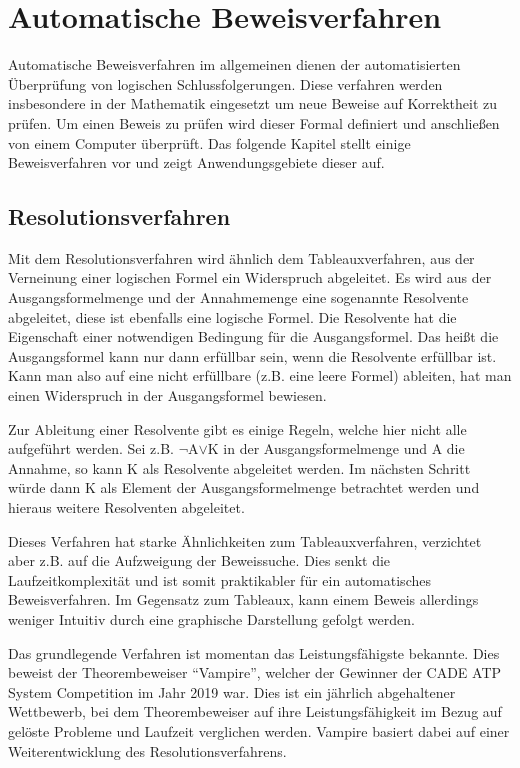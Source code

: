 
\chapter{Automatische Beweisverfahren}
Automatische Beweisverfahren im allgemeinen dienen der automatisierten Überprüfung von logischen Schlussfolgerungen. Diese verfahren werden insbesondere in der Mathematik eingesetzt um neue Beweise auf Korrektheit zu prüfen. Um einen Beweis zu prüfen wird dieser Formal definiert und anschließen von einem Computer überprüft. Das folgende Kapitel stellt einige Beweisverfahren vor und zeigt Anwendungsgebiete dieser auf.

\section{Resolutionsverfahren}
Mit dem Resolutionsverfahren wird ähnlich dem Tableauxverfahren, aus der Verneinung einer logischen Formel ein Widerspruch abgeleitet. Es wird aus der Ausgangsformelmenge und der Annahmemenge eine sogenannte Resolvente abgeleitet, diese ist ebenfalls eine logische Formel. Die Resolvente hat die Eigenschaft einer notwendigen Bedingung für die Ausgangsformel. Das heißt die Ausgangsformel kann nur dann erfüllbar sein, wenn die Resolvente erfüllbar ist. Kann man also auf eine nicht erfüllbare (z.B. eine leere Formel) ableiten, hat man einen Widerspruch in der Ausgangsformel bewiesen. \cite{RN16}

Zur Ableitung einer Resolvente gibt es einige Regeln, welche hier nicht alle aufgeführt werden. Sei z.B. $\neg$A$\vee$K in der Ausgangsformelmenge und A die Annahme, so kann K als Resolvente abgeleitet werden. Im nächsten Schritt würde dann K als Element der Ausgangsformelmenge betrachtet werden und hieraus weitere Resolventen abgeleitet. \cite{RN16}

Dieses Verfahren hat starke Ähnlichkeiten zum Tableauxverfahren, verzichtet aber z.B. auf die Aufzweigung der Beweissuche. Dies senkt die Laufzeitkomplexität und ist somit praktikabler für ein automatisches Beweisverfahren. Im Gegensatz zum Tableaux, kann einem Beweis allerdings weniger Intuitiv durch eine graphische Darstellung gefolgt werden.

Das grundlegende Verfahren ist momentan das Leistungsfähigste bekannte. Dies beweist der Theorembeweiser ``Vampire'', welcher der Gewinner der CADE ATP System Competition im Jahr 2019 war. Dies ist ein jährlich abgehaltener Wettbewerb, bei dem Theorembeweiser auf ihre Leistungsfähigkeit im Bezug auf gelöste Probleme und Laufzeit verglichen werden. \cite{casc_atp_comp} Vampire basiert dabei auf einer Weiterentwicklung des Resolutionsverfahrens.

